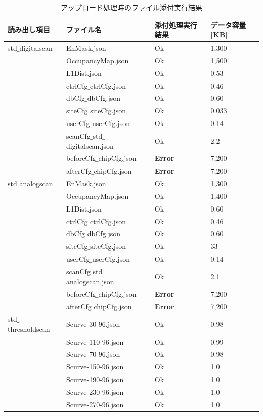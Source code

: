 \begin{longtable}{|llll|}
  \caption[アップロード処理時のファイル添付実行結果]{アップロード処理時のファイル添付実行結果}
  \label{upload_status_to_pd}
  \endhead
  \hline
  読み出し項目 & ファイル名 & 添付処理実行結果 & データ容量[KB]\\ 
  \hline
  std$\_$digitalscan & EnMask.json & Ok & 1,300 \\
   & OccupancyMap.json & Ok & 1,500 \\
   & L1Dist.json & Ok & 0.53 \\
   & ctrlCfg$\_$ctrlCfg.json & Ok & 0.46 \\
   & dbCfg$\_$dbCfg.json & Ok & 0.60 \\
   & siteCfg$\_$siteCfg.json & Ok & 0.033 \\
   & userCfg$\_$userCfg.json & Ok & 0.14 \\
   & scanCfg$\_$std$\_$digitalscan.json & Ok & 2.2 \\
   & beforeCfg$\_$chipCfg.json & { \bf Error} & 7,200 \\
   & afterCfg$\_$chipCfg.json & { \bf Error} & 7,200 \\
  \hline
  std$\_$analogscan & EnMask.json & Ok & 1,300 \\
   & OccupancyMap.json & Ok & 1,400 \\
   & L1Dist.json & Ok & 0.60 \\
   & ctrlCfg$\_$ctrlCfg.json & Ok & 0.46 \\
   & dbCfg$\_$dbCfg.json & Ok & 0.60 \\
   & siteCfg$\_$siteCfg.json & Ok & 33 \\
   & userCfg$\_$userCfg.json & Ok & 0.14 \\
   & scanCfg$\_$std$\_$analogscan.json & Ok & 2.1 \\
   & beforeCfg$\_$chipCfg.json & { \bf Error} & 7,200 \\
   & afterCfg$\_$chipCfg.json & { \bf Error} & 7,200 \\
  \hline
  std$\_$thresholdscan & Scurve-30-96.json & Ok & 0.98 \\
   & Scurve-110-96.json & Ok & 0.99 \\
   & Scurve-70-96.json & Ok & 0.98 \\
   & Scurve-150-96.json & Ok & 1.0 \\
   & Scurve-190-96.json & Ok & 1.0 \\
   & Scurve-230-96.json & Ok & 1.0 \\
   & Scurve-270-96.json & Ok & 1.0 \\

\end{longtable}
